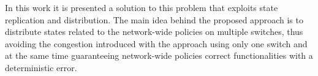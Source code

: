 In this work it is presented a solution to this problem that exploits state replication and distribution. The main idea behind the proposed approach is to distribute states related to the network-wide policies on multiple switches, thus avoiding the congestion introduced with the approach using only one switch and at the same time guaranteeing network-wide policies correct functionalities with a deterministic error.









